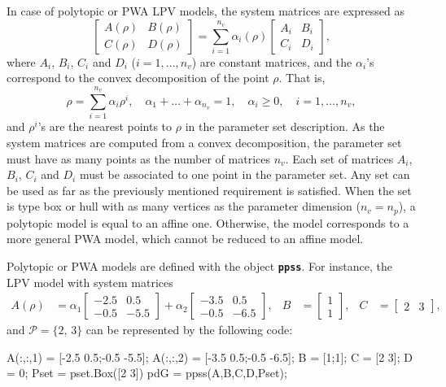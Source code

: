\documentclass[fleqn,11pt]{article}
\newcommand{\lcode}[1]{\textbf{%
    \lstinline[style=mystyle]{#1}}}
\newcommand{\p}{\rho}
\newcommand{\Pset}{\mathcal{P}}
\begin{document}
In case of polytopic or PWA LPV models, the system matrices are expressed as
\begin{equation}\label{eq:pwaLPVmodel}
    \begin{bmatrix}
        A(\p) & B(\p) \\
        C(\p) & D(\p)
    \end{bmatrix} =
    \sum_{i=1}^{n_v}\alpha_i(\p)
    \begin{bmatrix}
        A_i & B_i \\
        C_i & D_i
    \end{bmatrix},
\end{equation}
where $A_i$, $B_i$, $C_i$ and $D_i$ ($i=1,\dots,n_v$) are constant matrices, and the $\alpha_i$'s correspond to the convex decomposition of the point $\rho$. That is,
\begin{equation*}
    \p = \sum_{i=1}^{n_v}\alpha_i\rho^{i},
    \quad\alpha_1+\dots+\alpha_{n_v}=1,
    \quad \alpha_i\geq0, \quad i=1,\dots,n_v,
\end{equation*}
and $\p^i$'s are the nearest points to $\p$ in the parameter set description. As the system matrices are computed from a convex decomposition, the parameter set must have as many points as the number of matrices $n_v$. Each set of matrices $A_i$, $B_i$, $C_i$ and $D_i$ must be associated to one point in the parameter set. Any set can be used as far as the previously mentioned requirement is satisfied. When the set is type box or hull with as many vertices as the parameter dimension ($n_v=n_p$), a polytopic model is equal to an affine one. Otherwise, the model corresponds to a more general PWA model, which cannot be reduced to an affine model.

Polytopic or PWA models are defined with the object \lcode{ppss}. For instance, the LPV model with system matrices
\begin{align*}
    A(\p) &= \alpha_1
            \begin{bmatrix}
                -2.5 &  0.5 \\
                -0.5 & -5.5
            \end{bmatrix} + \alpha_2
            \begin{bmatrix}
                -3.5 &  0.5 \\
                -0.5 & -6.5
            \end{bmatrix},&
    B &= \begin{bmatrix}
          1 \\ 1
        \end{bmatrix},&
    C &= \begin{bmatrix}
          2 & 3
        \end{bmatrix},
\end{align*}
and $\Pset=\{2,\,3\}$ can be represented by the following code:
\begin{code}
A(:,:,1) = [-2.5 0.5;-0.5 -5.5];
A(:,:,2) = [-3.5 0.5;-0.5 -6.5];
B        = [1;1];
C        = [2 3];
D        = 0;
Pset = pset.Box([2 3])
pdG = ppss(A,B,C,D,Pset);
\end{code}
\end{document}
